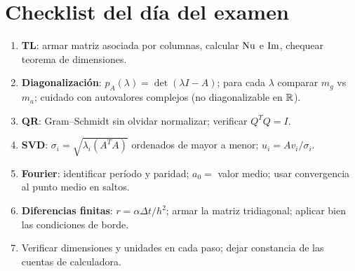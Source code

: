 \section*{Checklist del día del examen}
\begin{enumerate}
\item \textbf{TL}: armar matriz asociada por columnas, calcular $\operatorname{Nu}$ e $\operatorname{Im}$, chequear teorema de dimensiones.
\item \textbf{Diagonalización}: $p_A(\lambda)=\det(\lambda I-A)$; para cada $\lambda$ comparar $m_g$ vs $m_a$; cuidado con autovalores complejos (no diagonalizable en $\mathbb{R}$).
\item \textbf{QR}: Gram--Schmidt sin olvidar normalizar; verificar $Q^TQ=I$.
\item \textbf{SVD}: $\sigma_i=\sqrt{\lambda_i(A^TA)}$ ordenados de mayor a menor; $u_i=Av_i/\sigma_i$.
\item \textbf{Fourier}: identificar período y paridad; $a_0=$ valor medio; usar convergencia al punto medio en saltos.
\item \textbf{Diferencias finitas}: $r=\alpha\Delta t/h^2$; armar la matriz tridiagonal; aplicar bien las condiciones de borde.
\item Verificar dimensiones y unidades en cada paso; dejar constancia de las cuentas de calculadora.
\end{enumerate}
